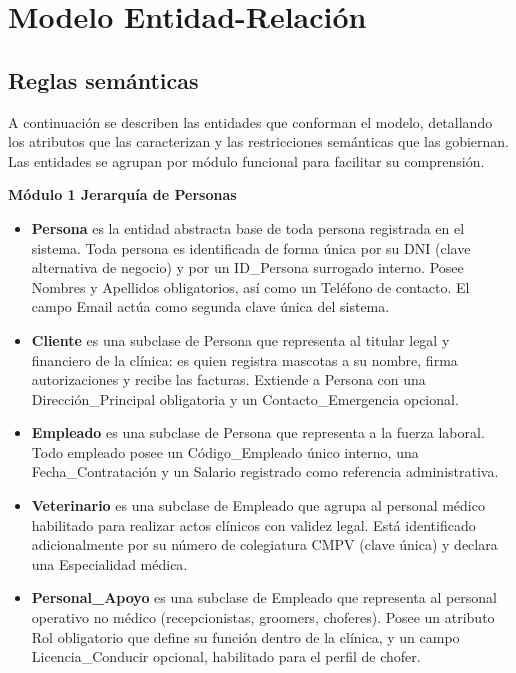 \chapter{Modelo Entidad-Relación}

\section{Reglas semánticas}

A continuación se describen las entidades que conforman el modelo, detallando los atributos que las caracterizan y las restricciones semánticas que las gobiernan. Las entidades se agrupan por módulo funcional para facilitar su comprensión.

\vspace{0.5cm}
\noindent \textbf{Módulo 1 Jerarquía de Personas}

\begin{itemize}
	\item \textbf{Persona} es la entidad abstracta base de toda persona registrada en el sistema. Toda persona es identificada de forma única por su DNI (clave alternativa de negocio) y por un ID\_Persona surrogado interno. Posee Nombres y Apellidos obligatorios, así como un Teléfono de contacto. El campo Email actúa como segunda clave única del sistema.
	\item \textbf{Cliente} es una subclase de Persona que representa al titular legal y financiero de la clínica: es quien registra mascotas a su nombre, firma autorizaciones y recibe las facturas. Extiende a Persona con una Dirección\_Principal obligatoria y un Contacto\_Emergencia opcional.
	\item \textbf{Empleado} es una subclase de Persona que representa a la fuerza laboral. Todo empleado posee un Código\_Empleado único interno, una Fecha\_Contratación y un Salario registrado como referencia administrativa.
	\item \textbf{Veterinario} es una subclase de Empleado que agrupa al personal médico habilitado para realizar actos clínicos con validez legal. Está identificado adicionalmente por su número de colegiatura CMPV (clave única) y declara una Especialidad médica.
	\item \textbf{Personal\_Apoyo} es una subclase de Empleado que representa al personal operativo no médico (recepcionistas, groomers, choferes). Posee un atributo Rol obligatorio que define su función dentro de la clínica, y un campo Licencia\_Conducir opcional, habilitado para el perfil de chofer.
\end{itemize}

